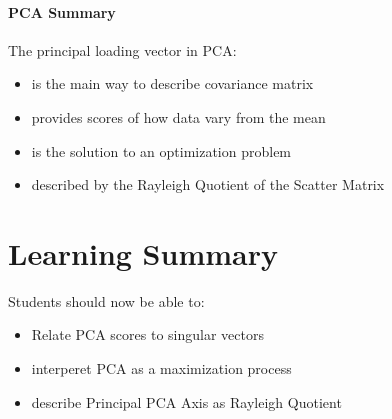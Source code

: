 \documentclass[12pt]{book}
\begin{document}
\paragraph{PCA Summary}
The principal loading vector in PCA:
\begin{itemize}
        \item is the main way to describe covariance matrix
        \item provides scores of how data vary from the mean
        \item is the solution to an optimization problem
        \item described by the Rayleigh Quotient of the Scatter Matrix
\end{itemize}

\section*{Learning Summary}
Students should now be able to:
\begin{itemize}
        \item Relate PCA scores to singular vectors
        \item interperet PCA as a maximization process
        \item describe Principal PCA Axis as Rayleigh Quotient
\end{itemize}
\end{document}
